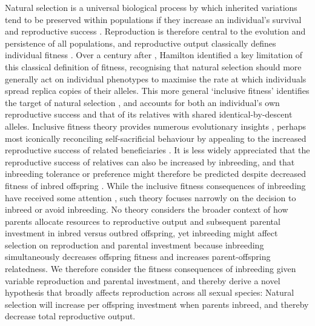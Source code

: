 \documentclass[12pt]{article}
\begin{document}
Natural selection is a universal biological process by which inherited variations tend to be preserved within populations if they increase an individual's survival and reproductive success \cite[][]{Darwin1859}. Reproduction is therefore central to the evolution and persistence of all populations, and reproductive output classically defines individual fitness \cite[][]{Dawkins1982}. Over a century after \cite{Darwin1859}, Hamilton \citeyearpar{Hamilton1964, Hamilton1964a} identified a key limitation of this classical definition of fitness, recognising that natural selection should more generally act on individual phenotypes to maximise the rate at which individuals spread replica copies of their alleles. This more general `inclusive fitness' identifies the target of natural selection \cite[][]{Grafen2006}, and accounts for both an individual's own reproductive success and that of its relatives with shared identical-by-descent alleles. Inclusive fitness theory provides numerous evolutionary insights \cite[][]{Gardner2014}, perhaps most iconically reconciling self-sacrificial behaviour by appealing to the increased reproductive success of related beneficiaries \cite[][]{Hamilton1964}. It is less widely appreciated that the reproductive success of relatives can also be increased by inbreeding, and that inbreeding tolerance or preference might therefore be predicted despite decreased fitness of inbred offspring \cite[][]{Parker1979}. While the inclusive fitness consequences of inbreeding have received some attention \cite[e.g.,][]{Parker2006, Kokko2006, Duthie2015a}, such theory focuses narrowly on the decision to inbreed or avoid inbreeding. No theory considers the broader context of how parents allocate resources to reproductive output and subsequent parental investment in inbred versus outbred offspring, yet inbreeding might affect selection on reproduction and parental investment because inbreeding simultaneously decreases offspring fitness and increases parent-offspring relatedness. We therefore consider the fitness consequences of inbreeding given variable reproduction and parental investment, and thereby derive a novel hypothesis that broadly affects reproduction across all sexual species: Natural selection will increase per offspring investment when parents inbreed, and thereby decrease total reproductive output.
\end{document}
